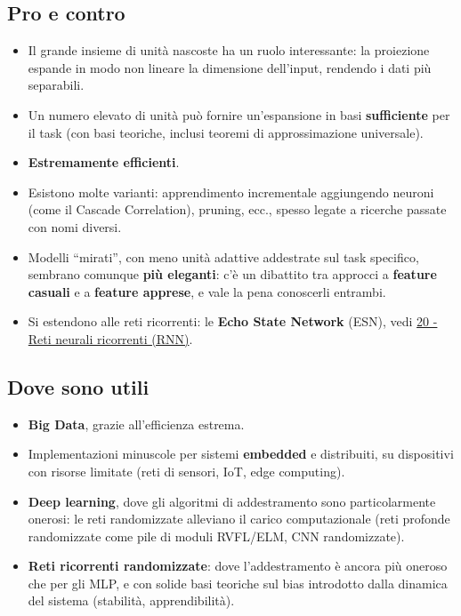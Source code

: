 \subsection{Pro e contro}\label{pro-e-contro}

\begin{itemize}
\tightlist
\item
  Il grande insieme di unità nascoste ha un ruolo interessante: la
  proiezione espande in modo non lineare la dimensione dell'input,
  rendendo i dati più separabili.
\item
  Un numero elevato di unità può fornire un'espansione in basi
  \textbf{sufficiente} per il task (con basi teoriche, inclusi teoremi
  di approssimazione universale).
\item
  \textbf{Estremamente efficienti}.
\item
  Esistono molte varianti: apprendimento incrementale aggiungendo
  neuroni (come il Cascade Correlation), pruning, ecc., spesso legate a
  ricerche passate con nomi diversi.
\item
  Modelli ``mirati'', con meno unità adattive addestrate sul task
  specifico, sembrano comunque \textbf{più eleganti}: c'è un dibattito
  tra approcci a \textbf{feature casuali} e a \textbf{feature apprese},
  e vale la pena conoscerli entrambi.
\item
  Si estendono alle reti ricorrenti: le \textbf{Echo State Network}
  (ESN), vedi
  \href{20\%20-\%20Reti\%20neurali\%20ricorrenti\%20(RNN)}{20 - Reti
  neurali ricorrenti (RNN)}.
\end{itemize}

\subsection{Dove sono utili}\label{dove-sono-utili}

\begin{itemize}
\tightlist
\item
  \textbf{Big Data}, grazie all'efficienza estrema.
\item
  Implementazioni minuscole per sistemi \textbf{embedded} e distribuiti,
  su dispositivi con risorse limitate (reti di sensori, IoT, edge
  computing).
\item
  \textbf{Deep learning}, dove gli algoritmi di addestramento sono
  particolarmente onerosi: le reti randomizzate alleviano il carico
  computazionale (reti profonde randomizzate come pile di moduli
  RVFL/ELM, CNN randomizzate).
\item
  \textbf{Reti ricorrenti randomizzate}: dove l'addestramento è ancora
  più oneroso che per gli MLP, e con solide basi teoriche sul bias
  introdotto dalla dinamica del sistema (stabilità, apprendibilità).
\end{itemize}

